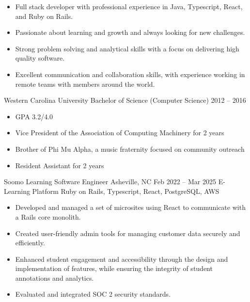 \documentclass[10pt, a4paper]{cvhari}
\begin{document}
\makecvheader
\medskip

    \begin{itemize}
        \item Full stack developer with professional experience in Java, Typescript, React, and Ruby on Rails.
        \item Passionate about learning and growth and always looking for new challenges.
        \item Strong problem solving and analytical skills with a focus on delivering high quality software.
        \item Excellent communication and collaboration skills, with experience working in remote teams with members around the world.
    \end{itemize}
    \medskip

    \medskip
    \education
        {Western Carolina University}
        {Bachelor of Science (Computer Science)}
        {2012 -- 2016}
        \par
        \smallskip
        \begin{itemize}
            \item GPA 3.2/4.0
            \item Vice President of the Association of Computing Machinery for 2 years
            \item Brother of Phi Mu Alpha, a music fraternity focused on community outreach
            \item Resident Assistant for 2 years
        \end{itemize}

    \company
        {Soomo Learning}
        {Software Engineer}
        {Asheville, NC}
        {Feb 2022 -- Mar 2025}
    \project
        {E-Learning Platform}
        {Ruby on Rails, Typescript, React, PostgreSQL, AWS}
    \begin{itemize}
        \item Developed and managed a set of microsites using React to communicate with a Rails core monolith. \smallskip
        \item Created user-friendly admin tools for managing customer data securely and efficiently.\smallskip
        \item Enhanced student engagement and accessibility through the design and implementation of features, while ensuring the integrity of student annotations and analytics.\smallskip
        \item Evaluated and integrated SOC 2 security standards. \smallskip
    \end{itemize}
    
\end{document}
